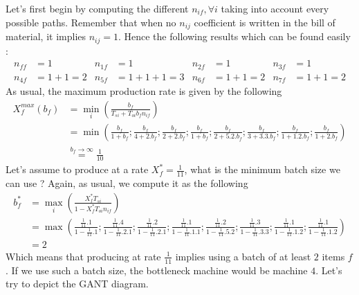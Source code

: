 Let's first begin by computing the different $n_{if}, \forall i$ taking into account every possible paths. Remember that when no $n_{ij}$ coefficient is written in the bill of material, it implies $n_{ij} = 1$. Hence the following results which can be found easily : 
\begin{align*}
    n_{ff} &= 1 & n_{1f} &= 1 & n_{2f} &= 1 & n_{3f} &= 1 \\
    n_{4f} &= 1+1 = 2 & n_{5f} &= 1+1+1 = 3 & n_{6f} &= 1+1=2 & n_{7f} &= 1+1 = 2
\end{align*}
As usual, the maximum production rate is given by the following 
\[
    \begin{split}
    X_f^{max}(b_f) &= \min_i\left( \frac{b_f}{T_{si} + T_{oi}b_fn_{if}} \right) \\
    &=
    \min\left(
        \frac{b_f}{1+b_f} ; 
        \frac{b_f}{4+2.b_f} ; 
        \frac{b_f}{2+2.b_f} ; 
        \frac{b_f}{1+b_f} ; 
        \frac{b_f}{2+5.2.b_f} ; 
        \frac{b_f}{3+3.3.b_f} ; 
        \frac{b_f}{1+1.2.b_f} ; 
        \frac{b_f}{1+2.b_f}
    \right)\\
    & \overset{b_f\rightarrow\infty}{=}
    \frac{1}{10}
    \end{split}
\]
Let's assume to produce at a rate $X_f^* = \frac{1}{11}$, what is the minimum batch size we can use ? Again, as usual, we compute it as the following
\begin{align*}
    b_f^* &= \max_i\left( \frac{X_f^*T_{si}}{1-X_f^*T_{oi}n_{if}} \right)\\
    &= \max\left(
        \frac{ \frac{1}{11}.1 }{ 1 - \frac{1}{11}.1 } ;
        \frac{ \frac{1}{11}.4 }{ 1 - \frac{1}{11}.2.1 } ;
        \frac{ \frac{1}{11}.2 }{ 1 - \frac{1}{11}.2.1 } ;
        \frac{ \frac{1}{11}.1 }{ 1 - \frac{1}{11}.1.1 } ;
        \frac{ \frac{1}{11}.2 }{ 1 - \frac{1}{11}.5.2 } ;
        \frac{ \frac{1}{11}.3 }{ 1 - \frac{1}{11}.3.3 } ;
        \frac{ \frac{1}{11}.1 }{ 1 - \frac{1}{11}.1.2 } ;
        \frac{ \frac{1}{11}.1 }{ 1 - \frac{1}{11}.1.2 }
    \right)\\
    &= 2
\end{align*}
Which means that producing at rate $\frac{1}{11}$ implies using a batch of at least $2$ items $f$. If we use such a batch size, the bottleneck machine would be machine $4$. Let's try to depict the GANT diagram.

